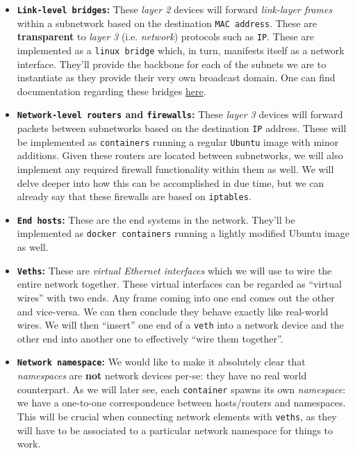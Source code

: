             \begin{itemize}
                \item \textbf{\texttt{Link-level bridges}:} These \textit{layer 2} devices will forward \textit{link-layer frames} within a subnetwork based on the destination \texttt{MAC address}. These are \textbf{transparent} to \textit{layer 3} (i.e. \textit{network}) protocols such as \texttt{IP}. These are implemented as a \texttt{linux bridge} which, in turn, manifests itself as a network interface. They'll provide the backbone for each of the subnets we are to instantiate as they provide their very own broadcast domain. One can find documentation regarding these bridges \href{https://wiki.linuxfoundation.org/networking/bridge}{here}.

                \item \textbf{\texttt{Network-level routers} and \texttt{firewalls}:} These \textit{layer 3} devices will forward packets between subnetworks based on the destination \texttt{IP} address. These will be implemented as \texttt{containers} running a regular \texttt{Ubuntu} image with minor additions. Given these routers are located between subnetworks, we will also implement any required firewall functionality within them as well. We will delve deeper into how this can be accomplished in due time, but we can already say that these firewalls are based on \texttt{iptables}.

                \item \textbf{\texttt{End hosts}:} These are the end systems in the network. They'll be implemented as \texttt{docker containers} running a lightly modified Ubuntu image as well.

                \item \textbf{\texttt{Veths}:} These are \textit{virtual Ethernet interfaces} which we will use to wire the entire network together. These virtual interfaces can be regarded as ``virtual wires'' with two ends. Any frame coming into one end comes out the other and vice-versa. We can then conclude they behave exactly like real-world wires. We will then ``insert'' one end of a \texttt{veth} into a network device and the other end into another one to effectively ``wire them together''.

                \item \textbf{\texttt{Network namespace}:} We would like to make it absolutely clear that \textit{namespaces} are \textbf{not} network devices per-se: they have no real world counterpart. As we will later see, each \texttt{container} spawns its own \textit{namespace}: we have a one-to-one correspondence between hosts/routers and namespaces. This will be crucial when connecting network elements with \texttt{veths}, as they will have to be associated to a particular network namespace for things to work.
            \end{itemize}

